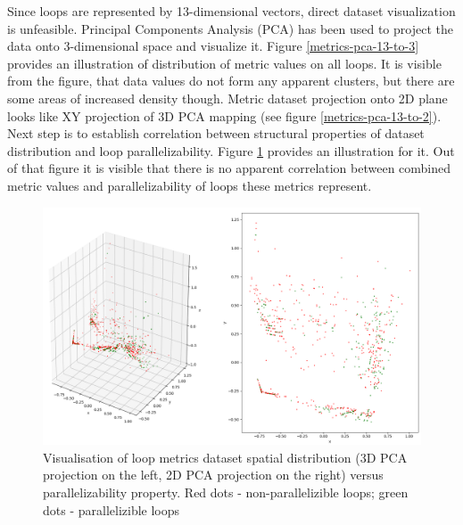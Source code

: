 \null\qquad Since loops are represented by 13-dimensional vectors, direct dataset visualization is unfeasible. Principal Components Analysis (PCA) has been used to project the data onto 3-dimensional space and visualize it. Figure \ref{metrics-pca-13-to-3} provides an illustration of distribution of metric values on all loops. It is visible from the figure, that data values do not form any apparent clusters, but there are some areas of increased density though. Metric dataset projection onto 2D plane looks like XY projection of 3D PCA mapping (see figure \ref{metrics-pca-13-to-2}).\newline
\null\qquad Next step is to establish correlation between structural properties of dataset distribution and loop parallelizability. Figure \ref{metrics-pca-parallelizability} provides an illustration for it. Out of that figure it is visible that there is no apparent correlation between combined metric values and parallelizability of loops these metrics represent. 
\begin{figure}[htb]
\centering
\includegraphics[width=\linewidth]{figs/metrics-pca-parallelizability.png}
\caption{Visualisation of loop metrics dataset spatial distribution (3D PCA projection on the left, 2D PCA projection on the right) versus parallelizability property. Red dots - non-parallelizible loops; green dots - parallelizible loops}
\label{metrics-pca-parallelizability}
\end{figure} \newline
